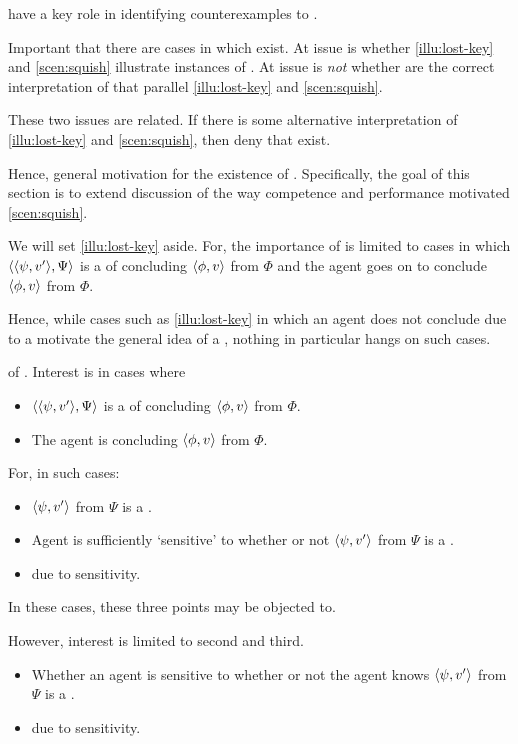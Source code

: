 \begin{note}
   have a key role in identifying counterexamples to \issueConstraint{}.

  Important that there are cases in which  exist.
  At issue is whether  \ref{illu:lost-key} and \ref{scen:squish} illustrate instances of .
  At issue is \emph{not} whether  are the correct interpretation of  that parallel  \ref{illu:lost-key} and \ref{scen:squish}.

  These two issues are related.
  If there is some alternative interpretation of  \ref{illu:lost-key} and \ref{scen:squish}, then deny that  exist.

  Hence, general motivation for the existence of \requ{}.
  Specifically, the goal of this section is to extend discussion of the way competence and performance motivated \autoref{scen:squish}.

  We will set \autoref{illu:lost-key} aside.
  For, the importance of  is limited to cases in which \(\langle \langle \psi, v' \rangle, \Psi \rangle\) is a  of concluding \(\langle \phi, v \rangle\) from \(\Phi\) and the agent goes on to conclude \(\langle \phi, v \rangle\) from \(\Phi\).

  Hence, while cases such as \autoref{illu:lost-key} in which an agent does not conclude due to a \requ{} motivate the general idea of a \requ{}, nothing in particular hangs on such cases.
\end{note}

\begin{note}
   of .
  Interest is in cases where

  \begin{itemize}
  \item
    \(\langle \langle \psi, v' \rangle, \Psi \rangle\) is a \requ{} of concluding \(\langle \phi, v \rangle\) from \(\Phi\).
  \item
    The agent is concluding \(\langle \phi, v \rangle\) from \(\Phi\).
  \end{itemize}
  For, in such cases:
  \begin{itemize}
  \item
    \(\langle \psi, v' \rangle\) from \(\Psi\) is a \fc{}.
  \item
    Agent is sufficiently `sensitive' to whether or not \(\langle \psi, v' \rangle\) from \(\Psi\) is a \fc{}.
  \item
    \ninf{} due to sensitivity.
  \end{itemize}
  In these cases, these three points may be objected to.

  However, interest is limited to second and third.

  \begin{itemize}
  \item
    Whether an agent is sensitive to whether or not the agent knows \(\langle \psi, v' \rangle\) from \(\Psi\) is a \fc{}.
  \item
     due to sensitivity.
  \end{itemize}
\end{note}

